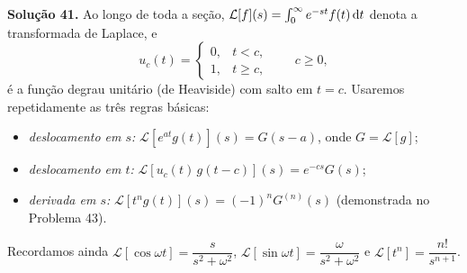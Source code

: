 \bigskip\noindent\textbf{Solução 41.}\quad
Ao longo de toda a seção, $\mathcal{L}[f](s)=\int_0^\infty e^{-st}f(t)\,\mathrm{d} t$ denota a transformada de Laplace, e
\[
u_c(t)=\begin{cases}0,&t<c,\\[1mm]1,&t\ge c,\end{cases}\qquad c\ge 0,
\]
é a função degrau unitário (de Heaviside) com salto em $t=c$. Usaremos repetidamente as três regras básicas:
\begin{itemize}[leftmargin=2.2em]
\item \emph{deslocamento em $s$:} $\mathcal{L}[e^{at}g(t)](s)=G(s-a)$, onde $G=\mathcal{L}[g]$;
\item \emph{deslocamento em $t$:} $\mathcal{L}[u_c(t)\,g(t-c)](s)=e^{-cs}G(s)$;
\item \emph{derivada em $s$:} $\mathcal{L}[t^n g(t)](s)=(-1)^n G^{(n)}(s)$ (demonstrada no Problema 43).
\end{itemize}
Recordamos ainda $\mathcal{L}[\cos\omega t]=\dfrac{s}{s^2+\omega^2}$, $\mathcal{L}[\sin\omega t]=\dfrac{\omega}{s^2+\omega^2}$ e $\mathcal{L}[t^n]=\dfrac{n!}{s^{n+1}}$.

